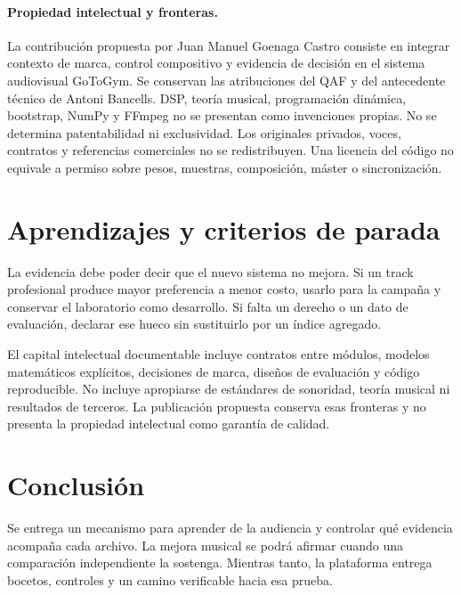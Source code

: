 \documentclass[11pt,a4paper]{article}
\begin{document}
\newpage
\paragraph{Propiedad intelectual y fronteras.}
La contribución propuesta por Juan Manuel Goenaga Castro consiste en integrar contexto de marca, control compositivo y evidencia de decisión en el sistema audiovisual GoToGym. Se conservan las atribuciones del QAF y del antecedente técnico de Antoni Bancells. DSP, teoría musical, programación dinámica, bootstrap, NumPy y FFmpeg no se presentan como invenciones propias. No se determina patentabilidad ni exclusividad. Los originales privados, voces, contratos y referencias comerciales no se redistribuyen. Una licencia del código no equivale a permiso sobre pesos, muestras, composición, máster o sincronización.
\section{Aprendizajes y criterios de parada}
La evidencia debe poder decir que el nuevo sistema no mejora. Si un track profesional produce mayor preferencia a menor costo, usarlo para la campaña y conservar el laboratorio como desarrollo. Si falta un derecho o un dato de evaluación, declarar ese hueco sin sustituirlo por un índice agregado.

El capital intelectual documentable incluye contratos entre módulos, modelos matemáticos explícitos, decisiones de marca, diseños de evaluación y código reproducible. No incluye apropiarse de estándares de sonoridad, teoría musical ni resultados de terceros. La publicación propuesta conserva esas fronteras y no presenta la propiedad intelectual como garantía de calidad.
\section{Conclusión}
Se entrega un mecanismo para aprender de la audiencia y controlar qué evidencia acompaña cada archivo. La mejora musical se podrá afirmar cuando una comparación independiente la sostenga. Mientras tanto, la plataforma entrega bocetos, controles y un camino verificable hacia esa prueba.
\end{document}
